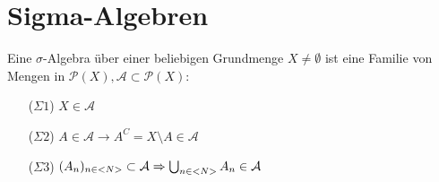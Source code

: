 \chapter{Sigma-Algebren}
\begin{definition}
	Eine $\sigma$-Algebra über einer beliebigen Grundmenge $X \neq \emptyset$ ist eine Familie von Mengen in $\mathcal{P}(X), \mathcal{A} \subset \mathcal{P}(X)$:
	\begin{itemize}
		\item[($\Sigma 1$)] $X \in \mathcal{A}$
		\item[($\Sigma 2$)] $A \in \mathcal{A} \to A^C = X \setminus A \in \mathcal{A}$
		\item[($\Sigma 3$)] $(A_n)_{n\in <N>} \subset \mathcal{A} \Rightarrow \bigcup_{n\in <N>}A_n \in \mathcal{A}$
	\end{itemize}
\end{definition}